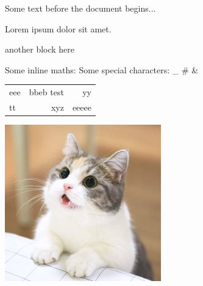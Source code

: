 Some text before the document begins...


    Lorem ipsum dolor sit amet. %



    { another block here }
    
    Some inline maths: %
    Some special characters: _ # &

    \begin{tabular}{lrr}
        eee & bbeb { test } & yy \\
        tt & xyz & eeeee
    \end{tabular}
    
    \includegraphics{./cat.jpg}

